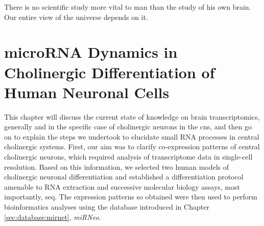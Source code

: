 \begin{savequote}[60mm]
There is no scientific study more vital to man than the study of his own brain. Our entire view of the universe depends on it.
\end{savequote}





\chapter[microRNA Dynamics in Cholinergic Differentiation\texorpdfstring{\\}{} of Human Neuronal Cells]{microRNA Dynamics in Cholinergic Differentiation of Human Neuronal Cells}
This chapter will discuss the current state of knowledge on brain transcriptomics, generally and in the specific case of cholinergic neurons in the \ac{cns}, and then go on to explain the steps we undertook to elucidate small RNA processes in central cholinergic systems. First, our aim was to clarify co-expression patterns of central cholinergic neurons, which required analysis of transcriptome data in single-cell resolution. Based on this information, we selected two human models of cholinergic neuronal differentiation and established a differentiation protocol amenable to RNA extraction and successive molecular biology assays, most importantly, \ac{seq}. The expression patterns so obtained were then used to perform bioinformatics analyses using the database introduced in Chapter \ref{sec:database:mirnet}, \textit{miRNeo}. 









